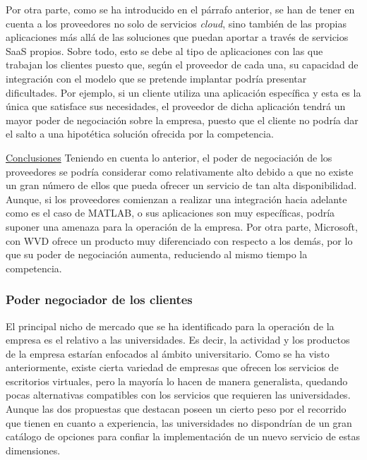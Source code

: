 Por otra parte, como se ha introducido en el párrafo anterior, se han de tener en cuenta a los proveedores no solo de servicios \textit{cloud}, sino también de las propias aplicaciones más allá de las soluciones que puedan aportar a través de servicios \acs{SaaS} propios. Sobre todo, esto se debe al tipo de aplicaciones con las que trabajan los clientes puesto que, según el proveedor de cada una, su capacidad de integración con el modelo que se pretende implantar podría presentar dificultades. Por ejemplo, si un cliente utiliza una aplicación específica y esta es la única que satisface sus necesidades, el proveedor de dicha aplicación tendrá un mayor poder de negociación sobre la empresa, puesto que el cliente no podría dar el salto a una hipotética solución ofrecida por la competencia.

\clearpage

\noindent\underline{Conclusiones}\newline
\indent Teniendo en cuenta lo anterior, el poder de negociación de los proveedores se podría considerar como relativamente alto debido a que no existe un gran número de ellos que pueda ofrecer un servicio de tan alta disponibilidad. Aunque, si los proveedores comienzan a realizar una integración hacia adelante como es el caso de MATLAB, o sus aplicaciones son muy específicas, podría suponer una amenaza para la operación de la empresa. Por otra parte, Microsoft, con \acs{WVD} ofrece un producto muy diferenciado con respecto a los demás, por lo que su poder de negociación aumenta, reduciendo al mismo tiempo la competencia.


\subsubsection{Poder negociador de los clientes}
El principal nicho de mercado que se ha identificado para la operación de la empresa es el relativo a las universidades. Es decir, la actividad y los productos de la empresa estarían enfocados al ámbito universitario. Como se ha visto anteriormente, existe cierta variedad de empresas que ofrecen los servicios de escritorios virtuales, pero la mayoría lo hacen de manera generalista, quedando pocas alternativas compatibles con los servicios que requieren las universidades. Aunque las dos propuestas que destacan poseen un cierto peso por el recorrido que tienen en cuanto a experiencia, las universidades no dispondrían de un gran catálogo de opciones para confiar la implementación de un nuevo servicio de estas dimensiones.


